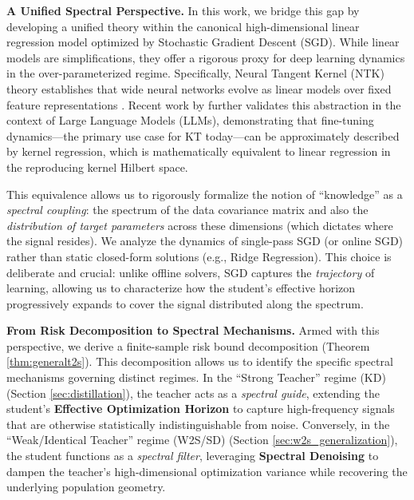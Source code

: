 \documentclass{article}
\theoremstyle{definition}
\theoremstyle{definition}
\theoremstyle{plain}
\theoremstyle{plain}
\theoremstyle{plain}
\theoremstyle{plain}
\theoremstyle{plain}
\begin{document}

\textbf{A Unified Spectral Perspective.}
In this work, we bridge this gap by developing a unified theory within the canonical high-dimensional linear regression model optimized by Stochastic Gradient Descent (SGD). While linear models are simplifications, they offer a rigorous proxy for deep learning dynamics in the over-parameterized regime. 
Specifically, Neural Tangent Kernel (NTK) theory establishes that wide neural networks evolve as linear models over fixed feature representations \citep{jacot2018neural}. 
Recent work by \citet{malladi2023kernelbasedviewlanguagemodel} further validates this abstraction in the context of Large Language Models (LLMs), demonstrating that fine-tuning dynamics---the primary use case for KT today---can be approximately described by kernel regression, which is mathematically equivalent to linear regression in the reproducing kernel Hilbert space.

This equivalence allows us to rigorously formalize the notion of ``knowledge'' as a \textit{spectral coupling}: the spectrum of the data covariance matrix and also the \emph{distribution of target parameters} across these dimensions (which dictates where the signal resides). We analyze the dynamics of single-pass SGD (or online SGD) rather than static closed-form solutions (e.g., Ridge Regression). This choice is deliberate and crucial: unlike offline solvers, SGD captures the \emph{trajectory} of learning, allowing us to characterize how the student's effective horizon progressively expands to cover the signal distributed along the spectrum. 

\textbf{From Risk Decomposition to Spectral Mechanisms.} 
Armed with this perspective, we derive a finite-sample risk bound decomposition (Theorem \ref{thm:generalt2s}). This decomposition allows us to identify the specific spectral mechanisms governing distinct regimes. In the ``Strong Teacher'' regime (KD) (Section \ref{sec:distillation}), the teacher acts as a \emph{spectral guide}, extending the student's \textbf{Effective Optimization Horizon} to capture high-frequency signals that are otherwise statistically indistinguishable from noise. Conversely, in the ``Weak/Identical Teacher'' regime (W2S/SD) (Section \ref{sec:w2s_generalization}), the student functions as a \emph{spectral filter}, leveraging \textbf{Spectral Denoising} to dampen the teacher's high-dimensional optimization variance while recovering the underlying population geometry.
\end{document}
